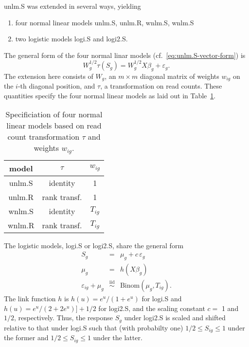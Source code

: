 \documentclass[letterpaper]{article}
\begin{document}
unlm.S was extended in several ways, yielding
\begin{enumerate}
\item four normal linear models unlm.S, unlm.R, wnlm.S, wnlm.S
\item two logistic models logi.S and logi2.S.
\end{enumerate}

The general form of the four normal linar models
(cf.~\ref{eq:unlm.S-vector-form}) is
\begin{equation}
W_g^{1/2} \tau(S_g) = W_g^{1/2} X \beta_g + \varepsilon_g.
\end{equation}
The extension here consists of \(W_g\), an \(m\times m\) diagonal matrix of
weights \(w_{ig}\) on the \(i\)-th diagonal position, and \(\tau\), a
transformation on read counts.  These quantities specify the four normal
linear models as laid out in Table~\ref{tab:nlm}.

\begin{table}
\begin{center}
\begin{tabular}{c|cc}
model & \(\tau\) & \(w_{ig}\) \\
\hline
unlm.S & identity & 1 \\
unlm.R & rank transf. & 1 \\
wnlm.S & identity & \(T_{ig}\) \\
wnlm.R & rank transf. & \(T_{ig}\) \\
\end{tabular}
\end{center}
\caption{Specificiation of four normal linear models based on read count
transformation \(\tau\) and weights \(w_{ig}\).}
\label{tab:nlm}
\end{table}

The logistic models, logi.S or logi2.S, share the general form
\begin{eqnarray}
S_g &=& \mu_g + c\, \varepsilon_g \\
\mu_g &=& h(X \beta_g) \\
\varepsilon_{ig} + \mu_g &\overset{\mathrm{iid}}{\sim}& \mathrm{Binom}(\mu_g, T_{ig}).
\label{eq:binom-error}
\end{eqnarray}
The link function \(h\) is \(h(u) = e^u / (1 + e^u)\) for logi.S and \(h(u) =
e^u / (2 + 2e^u)] + 1/2\) for logi2.S, and the scaling constant \(c=\) 1
 and \(1/2\), respectively.  Thus, the response \(S_g\) under logi2.S is scaled and shifted relative to
that under logi.S such that (with probabilty one) \(1/2\le S_{ig}\le 1\) under the former and
\(1/2\le S_{ig}\le 1\) under the latter.
\end{document}
